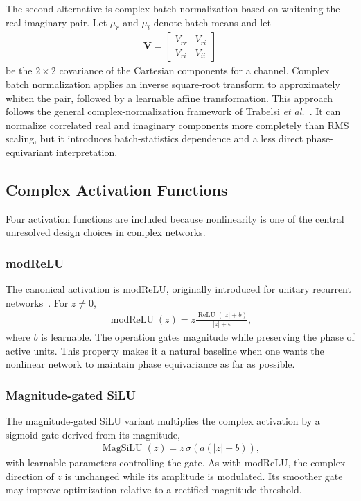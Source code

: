 \documentclass[journal]{IEEEtran}
\begin{document}
The second alternative is complex batch normalization based on whitening the real-imaginary pair. Let $\mu_r$ and $\mu_i$ denote batch means and let
\begin{align}
\mathbf{V}=
\begin{bmatrix}
V_{rr} & V_{ri}\\
V_{ri} & V_{ii}
\end{bmatrix}
\end{align}
be the $2\times2$ covariance of the Cartesian components for a channel. Complex batch normalization applies an inverse square-root transform to approximately whiten the pair, followed by a learnable affine transformation. This approach follows the general complex-normalization framework of Trabelsi \emph{et al.}~\cite{Trabelsi2018DeepComplex}. It can normalize correlated real and imaginary components more completely than RMS scaling, but it introduces batch-statistics dependence and a less direct phase-equivariant interpretation.

\subsection{Complex Activation Functions}
Four activation functions are included because nonlinearity is one of the central unresolved design choices in complex networks.

\subsubsection{modReLU}
The canonical activation is modReLU, originally introduced for unitary recurrent networks~\cite{Arjovsky2016Unitary}. For $z\neq0$,
\begin{align}
\operatorname{modReLU}(z)
= z\frac{\operatorname{ReLU}(|z|+b)}{|z|+\epsilon},
\label{eq:modrelu}
\end{align}
where $b$ is learnable. The operation gates magnitude while preserving the phase of active units. This property makes it a natural baseline when one wants the nonlinear network to maintain phase equivariance as far as possible.

\subsubsection{Magnitude-gated SiLU}
The magnitude-gated SiLU variant multiplies the complex activation by a sigmoid gate derived from its magnitude,
\begin{align}
\operatorname{MagSiLU}(z)
= z\,\sigma\left(a(|z|-b)\right),
\end{align}
with learnable parameters controlling the gate. As with modReLU, the complex direction of $z$ is unchanged while its amplitude is modulated. Its smoother gate may improve optimization relative to a rectified magnitude threshold.
\end{document}
